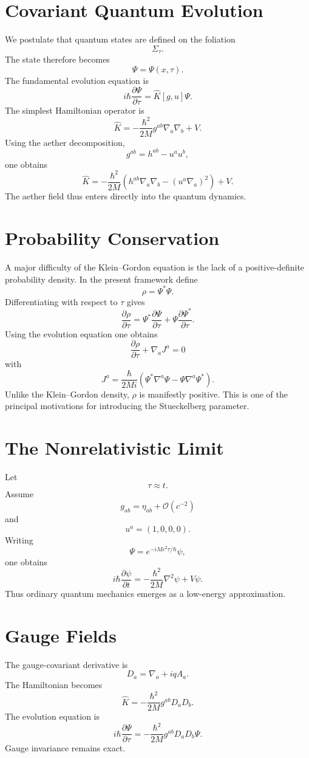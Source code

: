 \documentclass[11pt]{book}
\begin{document}
\section{Covariant Quantum Evolution}
We postulate that quantum states are defined on the foliation
\[\Sigma_\tau .\]
The state therefore becomes
\[\Psi=\Psi(x,\tau).\]
The fundamental evolution equation is
\[i\hbar\frac{\partial\Psi}{\partial\tau}=\hat K[g,u]\Psi.\]
The simplest Hamiltonian operator is
\[\hat K=-\frac{\hbar^2}{2M}g^{ab}\nabla_a\nabla_b+V .\]
Using the aether decomposition,
\[g^{ab}=h^{ab}-u^a u^b ,\]
one obtains
\[\hat K=-\frac{\hbar^2}{2M}\left(h^{ab}\nabla_a\nabla_b-(u^a\nabla_a)^2\right)+V.\]
The aether field thus enters directly into the quantum dynamics.

\section{Probability Conservation}
A major difficulty of the Klein--Gordon equation is the lack of a
positive-definite probability density.
In the present framework define
\[\rho=\Psi^*\Psi .\]
Differentiating with respect to $\tau$ gives
\[\frac{\partial\rho}{\partial\tau}=\Psi^*\frac{\partial\Psi}{\partial\tau}
+\Psi\frac{\partial\Psi^*}{\partial\tau}.\]
Using the evolution equation one obtains
\[\frac{\partial\rho}{\partial\tau}+\nabla_a J^a=0\]
with
\[J^a=\frac{\hbar}{2Mi}\left(\Psi^*\nabla^a\Psi-\Psi\nabla^a\Psi^*\right).\]
Unlike the Klein--Gordon density, $\rho$ is manifestly positive.
This is one of the principal motivations for introducing the
Stueckelberg parameter.

\section{The Nonrelativistic Limit}
Let
\[\tau \approx t.\]
Assume
\[g_{ab}=\eta_{ab}+\mathcal O(c^{-2})\]
and
\[u^a=(1,0,0,0).\]
Writing
\[\Psi=e^{-iMc^2\tau/\hbar}\psi ,\]
one obtains
\[i\hbar\frac{\partial\psi}{\partial t}=-\frac{\hbar^2}{2M}\nabla^2\psi+V\psi .\]
Thus ordinary quantum mechanics emerges as a low-energy approximation.

\section{Gauge Fields}
The gauge-covariant derivative is
\[D_a=\nabla_a+iqA_a .\]
The Hamiltonian becomes
\[\hat K=-\frac{\hbar^2}{2M}g^{ab}D_aD_b.\]
The evolution equation is
\[i\hbar\frac{\partial\Psi}{\partial\tau}=-\frac{\hbar^2}{2M}g^{ab}D_aD_b\Psi.\]
Gauge invariance remains exact.
\end{document}
